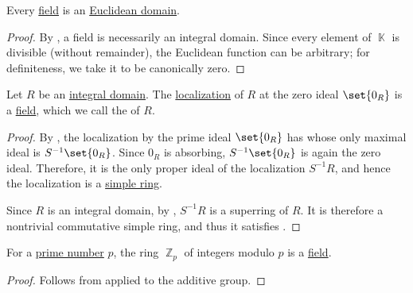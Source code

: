\begin{proposition}\label{thm:field_is_euclidean_domain}
  Every \hyperref[def:field]{field} is an \hyperref[def:euclidean_domain]{Euclidean domain}.
\end{proposition}
\begin{proof}
  By , a field is necessarily an integral domain. Since every element of \( \BbbK \) is divisible (without remainder), the Euclidean function can be arbitrary; for definiteness, we take it to be canonically zero.
\end{proof}

\begin{proposition}\label{thm:field_of_fractions}
  Let \( R \) be an \hyperref[def:integral_domain]{integral domain}. The \hyperref[def:ring_localization]{localization} of \( R \) at the zero ideal \( \set{ 0_R } \) is a \hyperref[def:field]{field}, which we call the  of \( R \).
\end{proposition}
\begin{proof}
  By , the localization by the prime ideal \( \set{ 0_R } \) has  whose only maximal ideal is \( S^{-1} \set{ 0_R } \). Since \( 0_R \) is absorbing, \( S^{-1} \set{ 0_R } \) is again the zero ideal.  Therefore, it is the only proper ideal of the localization \( S^{-1} R \), and hence the localization is a \hyperref[def:ring/simple]{simple ring}.

  Since \( R \) is an integral domain, by , \( S^{-1} R \) is a superring of \( R \). It is therefore a nontrivial commutative simple ring, and thus it satisfies .
\end{proof}

\begin{proposition}\label{thm:prime_fields}
  For a \hyperref[def:prime_number]{prime number} \( p \), the ring \hyperref[thm:ring_of_integers_modulo]{\( \BbbZ_p \)} of integers modulo \( p \) is a \hyperref[def:field]{field}.
\end{proposition}
\begin{proof}
  Follows from  applied to the additive group.
\end{proof}

